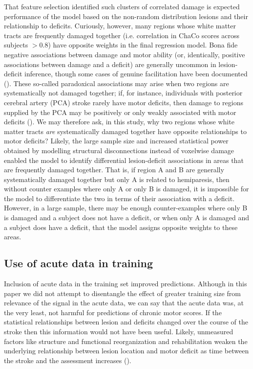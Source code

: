 \documentclass[phd,tocprelim]{cornell}
\begin{document}
That feature selection identified such clusters of correlated damage is expected performance of the model based on the non-random distribution lesions and their relationship to deficits. Curiously, however, many regions whose white matter tracts are frequently damaged together (i.e. correlation in ChaCo scores across subjects $>$0.8) have opposite weights in the final regression model. Bona fide negative associations between damage and motor ability (or, identically, positive associations between damage and a deficit) are generally uncommon in lesion-deficit inference, though some cases of genuine facilitation have been documented (\cite{Kapur1996-xq, Sperber2020-kp}). These so-called paradoxical associations may arise when two regions are systematically not damaged together; if, for instance, individuals with posterior cerebral artery (PCA) stroke rarely have motor deficits, then damage to regions supplied by the PCA may be positively or only weakly associated with motor deficits (\cite{Sperber2020-kp}). We may therefore ask, in this study, why two regions whose white matter tracts \textit{are} systematically damaged together have opposite relationships to motor deficits? Likely, the large sample size and increased statistical power obtained by modelling structural disconnections instead of voxelwise damage enabled the model to identify differential lesion-deficit associations in areas that are frequently damaged together. That is, if region A and B are generally systematically damaged together but only A is related to hemiparesis, then without counter examples where only A or only B is damaged, it is impossible for the model to differentiate the two in terms of their association with a deficit. However, in a large sample, there may be enough counter-examples where only B is damaged and a subject does not have a deficit, or when only A is damaged and a subject does have a deficit, that the model assigns opposite weights to these areas. 


\subsection{Use of acute data in training}
Inclusion of acute data in the training set improved predictions. Although in this paper we did not attempt to disentangle the effect of greater training size from relevance of the signal in the acute data, we can say that the acute data was, at the very least, not harmful for predictions of chronic motor scores. If the statistical relationships between lesion and deficits changed over the course of the stroke then this information would not have been useful. Likely, unmeasured factors like structure and functional reorganization and rehabilitation weaken the underlying relationship between lesion location and motor deficit as time between the stroke and the assessment increases (\cite{Shahid2017-gx}). 
\end{document}
